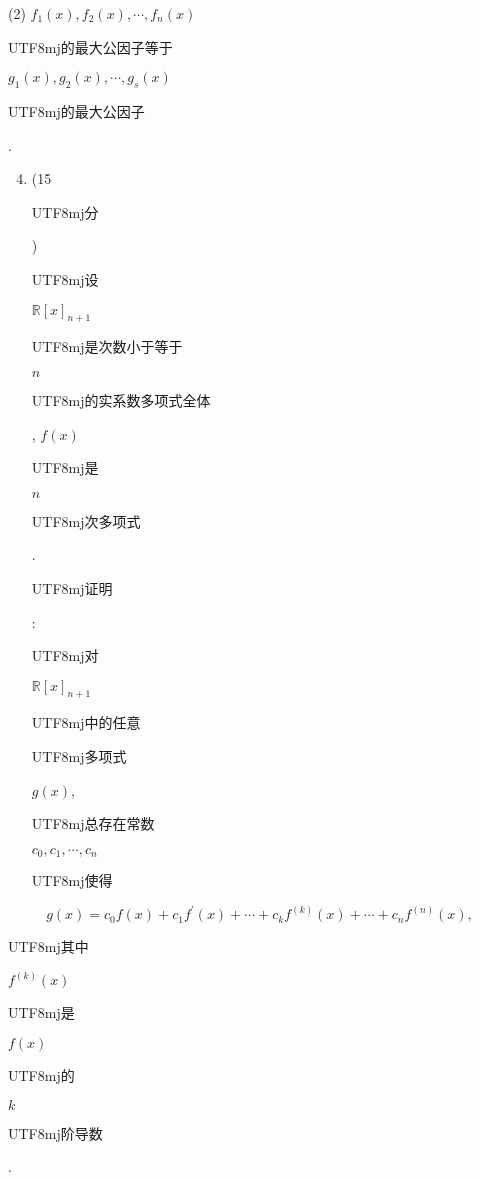 \documentclass[10pt]{article}
\begin{document}
(2) $f_{1}(x), f_{2}(x), \cdots, f_{n}(x)$ \begin{CJK}{UTF8}{mj}的最大公因子等于\end{CJK} $g_{1}(x), g_{2}(x), \cdots, g_{s}(x)$ \begin{CJK}{UTF8}{mj}的最大公因子\end{CJK}.

\begin{enumerate}
  \setcounter{enumi}{3}
  \item (15\begin{CJK}{UTF8}{mj}分\end{CJK}) \begin{CJK}{UTF8}{mj}设\end{CJK} $\mathbb{R}[x]_{n+1}$ \begin{CJK}{UTF8}{mj}是次数小于等于\end{CJK} $n$ \begin{CJK}{UTF8}{mj}的实系数多项式全体\end{CJK}, $f(x)$ \begin{CJK}{UTF8}{mj}是\end{CJK} $n$ \begin{CJK}{UTF8}{mj}次多项式\end{CJK}. \begin{CJK}{UTF8}{mj}证明\end{CJK}: \begin{CJK}{UTF8}{mj}对\end{CJK} $\mathbb{R}[x]_{n+1}$ \begin{CJK}{UTF8}{mj}中的任意\end{CJK} \begin{CJK}{UTF8}{mj}多项式\end{CJK} $g(x)$, \begin{CJK}{UTF8}{mj}总存在常数\end{CJK} $c_{0}, c_{1}, \cdots, c_{n}$ \begin{CJK}{UTF8}{mj}使得\end{CJK}
\end{enumerate}
$$
g(x)=c_{0} f(x)+c_{1} f^{\prime}(x)+\cdots+c_{k} f^{(k)}(x)+\cdots+c_{n} f^{(n)}(x),
$$
\begin{CJK}{UTF8}{mj}其中\end{CJK} $f^{(k)}(x)$ \begin{CJK}{UTF8}{mj}是\end{CJK} $f(x)$ \begin{CJK}{UTF8}{mj}的\end{CJK} $k$ \begin{CJK}{UTF8}{mj}阶导数\end{CJK}.
\end{document}
